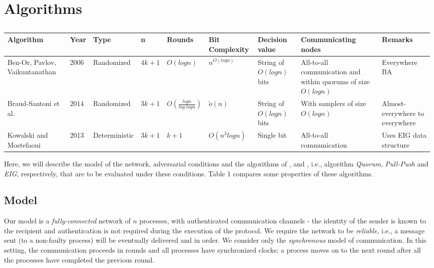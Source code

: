 ﻿\section{Algorithms}
\label{sec:algos}

\begin{table*}[ht]
    \vspace{-5mm}
    \caption{}
    \vspace{-2mm}
    \begin{tabular}{p{2cm}llllllp{2.5cm}p{2cm}}
\hline
\textbf{Algorithm} & \textbf{Year} & \textbf{Type} &\textbf{n} & \textbf{Rounds} & \textbf{Bit Complexity } &\textbf{Decision value} & \textbf{Communicating nodes}& \textbf{Remarks} \\ \hline
Ben-Or, Pavlov, Vaikuntanathan \cite{BPV06} & 2006 & Randomized & $4k + 1$ & $O(logn)$ & $n^{O(logn)}$      &String of $O(logn)$ bits &All-to-all communication and within quorums of size $O(logn)$   & Everywhere BA     \\
          Braud-Santoni et al. \cite{BGH13} & 2014 & Randomized & $3k + 1$ & $O(\frac{logn}{log\; log n})$ & $\tilde{o}(n)$      &String of $O(logn)$ bits &With samplers of size $O(logn)$  & Almost-everywhere to everywhere     \\
 Kowalski and Mostefaoui \cite{MHR14} & 2013   & Deterministic & $3k + 1$     & $k + 1$                     & $O(n^3logn)$ &Single bit  &All-to-all communication & Uses EIG data structure\\ \hline
%
\end{tabular}
\vspace{-2mm}
\end{table*}
Here, we will describe the model of the network, adversarial conditions and the algorithms of \cite{BPV06}, \cite{BGH13} and \cite{MHR14}, i.e., algorithm \textit{Quorum}, \textit{Pull-Push} and \textit{EIG}, respectively, that are to be evaluated under these conditions. Table 1 compares some properties of these algorithms.


\subsection{Model}
Our model is a \textit{fully-connected} network of $n$ processes, with authenticated communication channels - the identity of the sender is known to the recipient and authentication is not required during the execution of the protocol. We require the network to be \textit{reliable}, i.e., a message sent (to a non-faulty process) will be eventually delivered and in order. We consider only the \textit{synchronous} model of communication. In this setting, the communication proceeds in rounds and all processes have synchronized clocks; a process moves on to the next round after all the processes have completed the previous round. %

